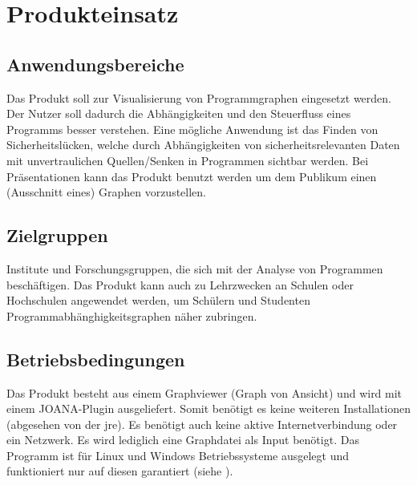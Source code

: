 \chapter{Produkteinsatz}\label{ch:einsatz}

\section{Anwendungsbereiche}
Das Produkt soll zur Visualisierung von Programmgraphen eingesetzt werden.
Der Nutzer soll dadurch die Abhängigkeiten und den Steuerfluss eines Programms besser verstehen.
Eine mögliche Anwendung ist das Finden von Sicherheitslücken, welche durch Abhängigkeiten von sicherheitsrelevanten Daten mit unvertraulichen Quellen/Senken in Programmen sichtbar werden.
Bei Präsentationen kann das Produkt benutzt werden um dem Publikum einen (Ausschnitt eines) Graphen vorzustellen.

\section{Zielgruppen}
Institute und Forschungsgruppen, die sich mit der Analyse von Programmen beschäftigen.
Das Produkt kann auch zu Lehrzwecken an Schulen oder Hochschulen angewendet werden, um Schülern und Studenten Programmabhänghigkeitsgraphen näher zubringen.

\section{Betriebsbedingungen}
Das Produkt besteht aus einem Graphviewer (Graph von Ansicht) und wird mit einem JOANA-Plugin ausgeliefert.
Somit benötigt es keine weiteren Installationen (abgesehen von der \gls{jre}).
Es benötigt auch keine aktive Internetverbindung oder ein Netzwerk.
Es wird lediglich eine Graphdatei als Input benötigt.
Das Programm ist für Linux und Windows Betriebssysteme ausgelegt und funktioniert nur auf diesen garantiert (siehe ).

